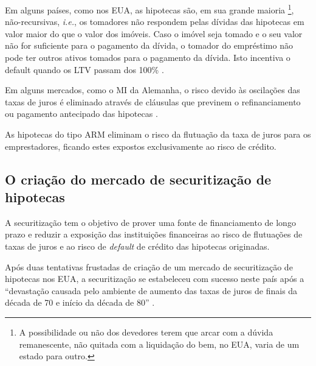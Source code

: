 \documentclass[
	12pt,				%
	oneside,			%
	a4paper,			%
	chapter=TITLE,		%
	section=TITLE,		%
	english,			%
	brazil				%
	]{abntex2}
\begin{document}
\begin{refsection}
Em alguns países, como nos EUA, as hipotecas são, em sua grande maioria \footnote{A possibilidade ou não dos devedores terem que arcar com a dúvida
  remanescente, não quitada com a liquidação do bem, no EUA, varia de um estado
  para outro.},
não-recursivas, \emph{i.e.}, os tomadores não respondem pelas dívidas das hipotecas
em valor maior do que o valor dos imóveis. Caso o imóvel seja tomado e o seu
valor não for suficiente para o pagamento da dívida, o tomador do empréstimo não
pode ter outros ativos tomados para o pagamento da dívida. Isto incentiva o
default quando os \gls{LTV} passam dos 100\% \autocite{ghent}.

Em alguns mercados, como o \gls{MI} da Alemanha, o risco devido às oscilações
das taxas de juros é eliminado através de cláusulas que previnem o
refinanciamento ou pagamento antecipado das hipotecas \autocite[p.58]{green}.

As hipotecas do tipo \gls{ARM} eliminam o risco da flutuação da taxa de juros
para os emprestadores, ficando estes expostos exclusivamente ao risco de crédito.

\hypertarget{o-criauxe7uxe3o-do-mercado-de-securitizauxe7uxe3o-de-hipotecas}{%
\subsection{O criação do mercado de securitização de hipotecas}\label{o-criauxe7uxe3o-do-mercado-de-securitizauxe7uxe3o-de-hipotecas}}

A securitização tem o objetivo de prover uma fonte de financiamento de longo
prazo e reduzir a exposição das instituições financeiras ao risco de flutuações
de taxas de juros e ao risco de \emph{default} de crédito das hipotecas originadas.

Após duas tentativas frustadas de criação de um mercado de securitização de
hipotecas nos EUA, a securitização se estabeleceu com sucesso neste país após a
``devastação causada pelo ambiente de aumento das taxas de juros de finais da
década de 70 e início da década de 80'' \autocite[p.~215]{simkovic}.


\end{refsection}
\end{document}
